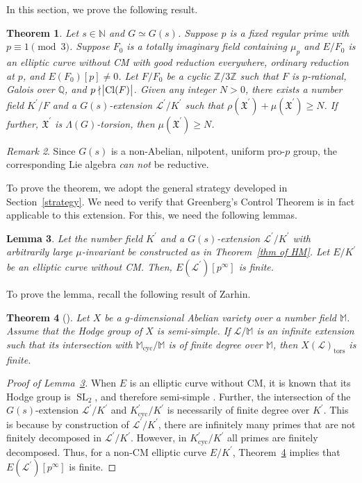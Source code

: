 \documentclass{amsart}
\DeclareMathOperator{\cyc}{cyc}
\DeclareMathOperator{\Cl}{Cl}
\DeclareMathOperator{\tors}{tors}
\DeclareMathOperator{\SL}{SL}
\newcommand{\QQ}{\mathbb Q}
\newcommand{\FF}{\mathbb M}
\newcommand{\ZZ}{\mathbb Z}
\newcommand{\NN}{\mathbb N}
\newcommand{\Linf}{\mathcal{L}}
\newcommand{\X}{\mathfrak X}
\newtheorem{Th}{Theorem}[section]
\newtheorem{Lemma}[Th]{Lemma}
\theoremstyle{definition}
\theoremstyle{remark}
\newtheorem{rem}[Th]{Remark}
\begin{document}
In this section, we prove the following result.
\begin{Th}
\label{particular example our case}
Let $s\in \NN$ and $G\simeq G(s)$.
Suppose $p$ is a fixed regular prime with $p\equiv 1 \pmod{3}$.
Suppose $F_0$ is a totally imaginary field containing $\mu_p$ and $E/F_0$ is an elliptic curve without CM with good reduction everywhere, ordinary reduction at $p$, and $E(F_0)[p]\neq 0$.
Let $F/F_0$ be a cyclic $\ZZ/3\ZZ$ such that $F$ is $p$-rational, Galois over $\QQ$, and $p\nmid \abs{ \Cl(F)}$.
Given any integer $N>0$, there exists a number field $K^\prime/F$ and a $G(s)$-extension $\Linf^\prime/K^\prime$ such that $\rho(\X^\prime) + \mu(\X^\prime) \geq N$.
If further, $\X^\prime$ is $\Lambda(G)$-torsion, then $\mu(\X^\prime) \geq N$.  
\end{Th}

\begin{rem}
Since $G(s)$ is a non-Abelian, nilpotent, uniform pro-$p$ group, the corresponding Lie algebra \textit{can not} be reductive.
\end{rem}

To prove the theorem, we adopt the general strategy developed in Section~\ref{strategy}.
We need to verify that Greenberg's Control Theorem is in fact applicable to this extension.
For this, we need the following lemmas.

\begin{Lemma}
\label{lemma finite torsion}
Let the number field $K^\prime$ and a $G(s)$-extension $\Linf^\prime/K^\prime$ with arbitrarily large $\mu$-invariant be constructed as in Theorem~\ref{thm of HM}. 
Let $E/K^\prime$ be an elliptic curve without CM.
Then, $E(\Linf^\prime)[p^\infty]$ is finite.
\end{Lemma}

To prove the lemma, recall the following result of Zarhin.
\begin{Th}[{\cite[Main Theorem]{Zar99}}]
\label{main theorem zarhin}
Let $X$ be a $g$-dimensional Abelian variety over a number field $\FF$.
Assume that the Hodge group of $X$ is semi-simple.
If $\Linf/\FF$ is an infinite extension such that its intersection with $\FF_{\cyc}/\FF$ is of finite degree over $\FF$, then $X(\Linf)_{\tors}$ is finite.  
\end{Th}

\begin{proof}[Proof of Lemma~\ref{lemma finite torsion}]
When $E$ is an elliptic curve without CM, it is known that its Hodge group is $\SL_2$, and therefore semi-simple \cite[Section 2]{Mum69}.  
Further, the intersection of the $G(s)$-extension $\Linf^\prime/K^\prime$ and $K^\prime_{\cyc}/K^\prime$ is necessarily of finite degree over $K^\prime$.
This is because by construction of $\Linf^\prime/K^\prime$, there are infinitely many primes that are not finitely decomposed in $\Linf^\prime/K^\prime$.
However, in $K^\prime_{\cyc}/K^\prime$ all primes are finitely decomposed. 
Thus, for a non-CM elliptic curve $E/K^\prime$, Theorem~\ref{main theorem zarhin} implies that $E(\Linf^\prime)[p^\infty]$ is finite.
\end{proof}
\end{document}
